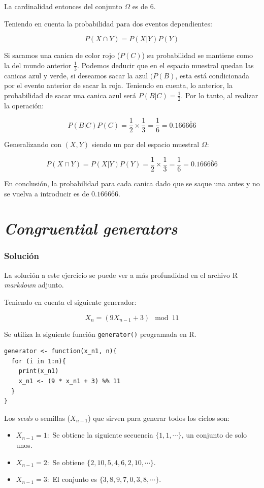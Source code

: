 \documentclass[12pt]{article}
\begin{document}
La cardinalidad entonces del conjunto \(\Omega\) es de 6.

Teniendo en cuenta la probabilidad para dos eventos dependientes:

\[
  P(X \cap Y) = P(X|Y) P(Y)
\]

Si sacamos una canica de color rojo (\(P(C)\)) su probabilidad se mantiene como la del mundo anterior \(\frac{1}{3}\). Podemos deducir que en el espacio muestral quedan las canicas azul y verde, si deseamos sacar la azul \((P(B)\), esta está condicionada por el evento anterior de sacar la roja. Teniendo en cuenta, lo anterior, la probabilidad de sacar una canica azul será \(P(B|C) = \frac{1}{2}\). Por lo tanto, al realizar la operación:

\[
  P(B|C)P(C) = \frac{1}{2} \times \frac{1}{3} = \frac{1}{6} = 0.166\overline{666}
\]

Generalizando con \((X, Y)\) siendo un par del espacio muestral \(\Omega\):

\[
  P(X \cap Y) = P(X|Y)P(Y) = \frac{1}{2} \times \frac{1}{3} = \frac{1}{6} =  0.166\overline{666}
\]

En conclusión, la probabilidad para cada canica dado que se saque una antes y no se vuelva a introducir es de \(0.166\overline{666}\). 

\section{\textit{Congruential generators}}
\subsubsection{Solución}

La solución a este ejercicio se puede ver a más profundidad en el archivo \textsf{R} \textit{markdown} adjunto.  

Teniendo en cuenta el siguiente generador:

\[
  X_{n} = (9X_{n-1} + 3) \mod 11
\]

Se utiliza la siguiente función \lstinline|generator()| programada en \textsf{R}.

\begin{lstlisting}
generator <- function(x_n1, n){
  for (i in 1:n){
    print(x_n1)
    x_n1 <- (9 * x_n1 + 3) %% 11
  }
}
\end{lstlisting}

Los \textit{seeds} o semillas ($X_{n-1}$) que sirven para generar todos los ciclos son:

\begin{itemize}
  \item $X_{n-1} = 1:$ Se obtiene la siguiente secuencia $\{1, 1, \cdots \}$, un conjunto de solo unos.
  \item $X_{n-1} = 2:$ Se obtiene $\{2, 10, 5, 4, 6, 2, 10, \cdots \}$.
  \item $X_{n-1} = 3:$ El conjunto es $\{3, 8, 9, 7, 0, 3, 8, \cdots \} $.
\end{itemize}
\end{document}

